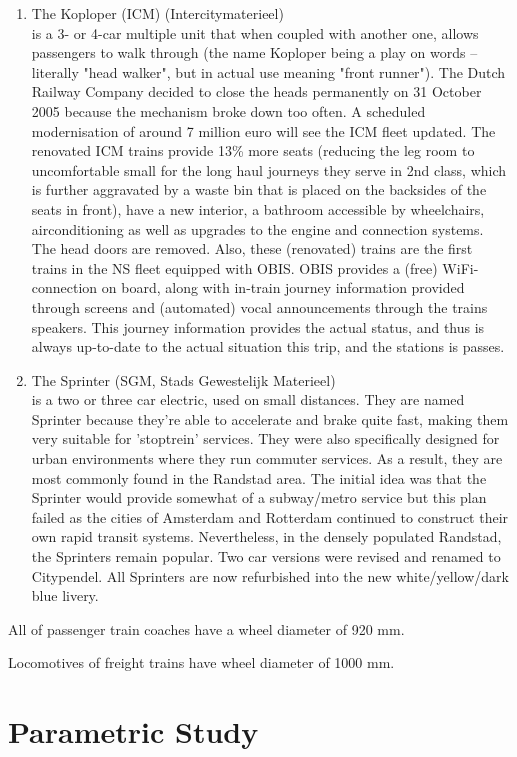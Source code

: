 \begin{enumerate}
    \item The Koploper (ICM) (Intercitymaterieel) \\ is a 3- or 4-car multiple unit that when coupled with another one, allows passengers to walk through (the name Koploper being a play on words – literally "head walker", but in actual use meaning "front runner"). The Dutch Railway Company decided to close the heads permanently on 31 October 2005 because the mechanism broke down too often. A scheduled modernisation of around 7 million euro will see the ICM fleet updated. The renovated ICM trains provide 13\% more seats (reducing the leg room to uncomfortable small for the long haul journeys they serve in 2nd class, which is further aggravated by a waste bin that is placed on the backsides of the seats in front), have a new interior, a bathroom accessible by wheelchairs, airconditioning as well as upgrades to the engine and connection systems. The head doors are removed. Also, these (renovated) trains are the first trains in the NS fleet equipped with OBIS. OBIS provides a (free) WiFi-connection on board, along with in-train journey information provided through screens and (automated) vocal announcements through the trains speakers. This journey information provides the actual status, and thus is always up-to-date to the actual situation this trip, and the stations is passes.
    \item The Sprinter (SGM, Stads Gewestelijk Materieel) \\ is a two or three car electric, used on small distances. They are named Sprinter because they're able to accelerate and brake quite fast, making them very suitable for 'stoptrein' services. They were also specifically designed for urban environments where they run commuter services. As a result, they are most commonly found in the Randstad area. The initial idea was that the Sprinter would provide somewhat of a subway/metro service but this plan failed as the cities of Amsterdam and Rotterdam continued to construct their own rapid transit systems. Nevertheless, in the densely populated Randstad, the Sprinters remain popular. Two car versions were revised and renamed to Citypendel. All Sprinters are now refurbished into the new white/yellow/dark blue livery.
\end{enumerate}

All of passenger train coaches have a wheel diameter of 920 mm. 

Locomotives of freight trains have wheel diameter of 1000 mm.

\chapter{Parametric Study}

